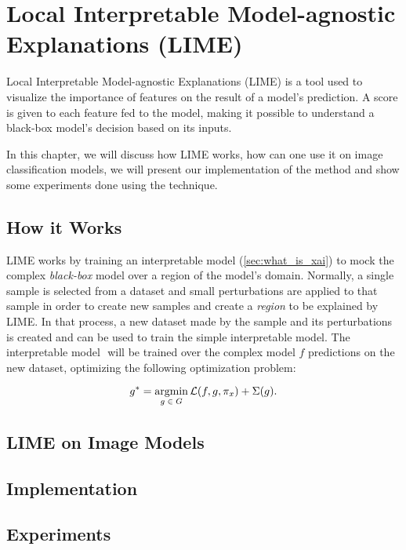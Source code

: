 \chapter{Local Interpretable Model-agnostic Explanations (LIME)}

Local Interpretable Model-agnostic Explanations (LIME) \citep{ribeiro2016whyitrustyou}  is a tool used to visualize the importance of features on the result of a model's prediction.
A score is given to each feature fed to the model, making it possible to understand a black-box model's decision based on its inputs. 

In this chapter, we will discuss how LIME works, how can one use it on image classification models, we will present our implementation of the method and show some experiments done using the technique. 

\section{How it Works}

LIME works by training an interpretable model (\ref{sec:what_is_xai}) to mock the complex \emph{black-box} model over a region of the model's domain. 
Normally, a single sample is selected from a dataset and small perturbations are applied to that sample in order to create new samples and create a \emph{region} to be explained by LIME.
In that process, a new dataset made by the sample and its perturbations is created and can be used to train the simple interpretable model. 
The interpretable model \(\) will be trained over the complex model \(f\) predictions on the new dataset, optimizing the following optimization problem:

\begin{equation}
    g^* = \operatorname*{argmin}_{g \;\in\; G} \mathcal{L}(f, g, \pi_x) + \Sigma(g).
    \label{eq:lime_optimization}  
\end{equation}

\section{LIME on Image Models}

\section{Implementation}


\section{Experiments}